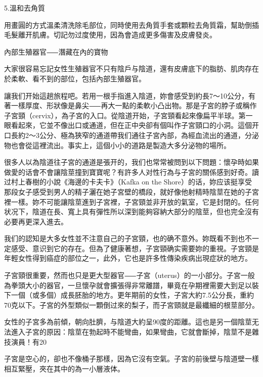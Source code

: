 \documentclass[12pt,UTF8]{ctexbook}
\begin{document}
5.溫和去角質


用畫圓的方式溫柔清洗除毛部位，同時使用去角質手套或顆粒去角質霜，幫助倒插毛髮離开肌膚。切記勿过度使用，因為會造成更多傷害及皮膚發炎。





內部生殖器官⸺潛藏在內的寶物




大家很容易忘記女性生殖器官不只有陰戶与陰道，還有皮膚底下的脂肪、肌肉存在於柔軟、看不到的部位，包括內部生殖器官。

讓我们开始這趟旅程吧。若用一根手指進入陰道，妳會感受到約長7〜10公分，有著一樣厚度、形狀像是鼻尖⸺再大一點的柔軟小凸出物。那是子宮的脖子或稱作子宮頸（cervix），為子宮的入口。從陰道开始，子宮頸看起來像扁平半球。第一眼看起來，它並不像出口或通道，但在正中央卻有個叫作子宮頸口的小洞。這個开口長約2〜3公分、極為狹窄的通道帶我们通往子宮內部，為經血流出的通道，分泌物也會從這裡流出。事实上，這個小小的道路是製造大多分泌物的場所。





很多人以為陰道往子宮的通道是張开的，我们也常常被問到以下問題：懷孕時如果做愛的话會不會讓陰莖撞到寶寶呢？有許多人对性行為与子宮的關係感到好奇。讀过村上春樹的小說《海邊的卡夫卡》（Kafka on the Shore）的话，妳应该挺享受那段女子感受到男人的精子灑在她子宮壁的橋段，就好像他射精時陰莖在她的子宮裡一樣。妳不可能讓陰莖進到子宮裡，子宮頸並非开放的氣室，它是封閉的。任何状况下，陰道在長、寬上具有彈性所以深到能夠容納大部分的陰莖，但也完全沒有必要再更深入進去。

我们的認知是大多女性並不注意自己的子宮頸，也的确不意外。妳既看不到也不一定感受、意识到它的存在。但為了健康著想，子宮頸确实需要妳的重視。子宮頸是年輕女性得到癌症的部位之一，此外，它也是許多性傳染疾病出現症狀的地方。

子宮頸很重要，然而也只是更大型器官⸺子宮（uterus）的一小部分。子宮一般為拳頭大小的器官，一旦懷孕就會擴張得非常離譜，畢竟在孕期裡需要大到足以裝下一個（或多個）成長胚胎的地方。更年期前的女性，子宮大約7.5公分長，重約70克以下。子宮的外型類似一顆倒过來的梨子，而子宮頸就是最纖細的根莖部分。

女性的子宮多為前傾，朝向肚臍，与陰道大約呈90度的距離。這也是另一個陰莖无法進入子宮的原因：陰莖在勃起時不能彎曲，如果彎曲，它就會斷掉，陰莖不是雜技演員！有20%

子宮是空心的，卻也不像桶子那樣，因為它沒有空氣。子宮的前後壁与陰道壁一樣相互緊壓，夾在其中的為一小層液体。
\end{document}
